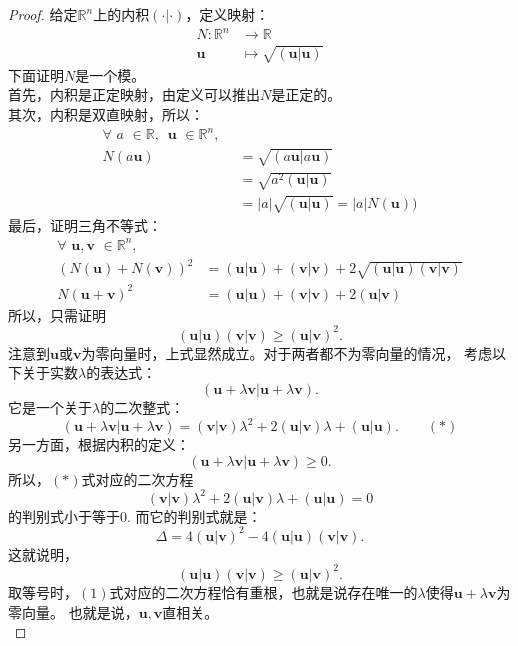 \documentclass[12pt,UTF8,fontset=none]{ctexbook}
\begin{document}
\begin{proof} %
    给定$\mathbb{R}^n$上的内积$(\cdot | \cdot)$，定义映射：
    \begin{align*}
        N : \mathbb{R}^n &\rightarrow \mathbb{R}  \\
        \mathbf{u} & \mapsto  \sqrt{(\mathbf{u} | \mathbf{u})} 
    \end{align*}
    下面证明$N$是一个模。\\
    首先，内积是正定映射，由定义可以推出$N$是正定的。\\
    其次，内积是双直映射，所以：
    \begin{align*}
        \forall \,\, a \,\, \in \mathbb{R}, \,\,\,  \mathbf{u} \,\, \in \mathbb{R}^n, \,\,\,  \\
        N(a\mathbf{u}) &= \sqrt{(a\mathbf{u} | a\mathbf{u})}  \\
        &= \sqrt{a^2(\mathbf{u} | \mathbf{u})}  \\
        &= |a| \sqrt{(\mathbf{u} | \mathbf{u})} = |a|N(\mathbf{u}))
    \end{align*}
    最后，证明三角不等式：
    \begin{align*}
        \forall \,\, \mathbf{u} ,  \mathbf{v} \,\, \in \mathbb{R}^n, \,\,\,  \\
        (N(\mathbf{u}) + N(\mathbf{v}))^2 &= (\mathbf{u} | \mathbf{u}) + (\mathbf{v} | \mathbf{v}) + 2\sqrt{(\mathbf{u} | \mathbf{u})(\mathbf{v} | \mathbf{v})}  \\
        N(\mathbf{u}+\mathbf{v})^2 &= (\mathbf{u} | \mathbf{u}) + (\mathbf{v} | \mathbf{v}) + 2(\mathbf{u} | \mathbf{v}) 
    \end{align*}
    所以，只需证明
    $$ (\mathbf{u} | \mathbf{u})(\mathbf{v} | \mathbf{v}) \geqslant (\mathbf{u} | \mathbf{v})^2. $$
    注意到$\mathbf{u}$或$\mathbf{v}$为零向量时，上式显然成立。对于两者都不为零向量的情况，
    考虑以下关于实数$\lambda$的表达式：
    $$ (\mathbf{u}+ \lambda\mathbf{v} |\mathbf{u}+ \lambda\mathbf{v} ). $$
    它是一个关于$\lambda$的二次整式：
    $$ (\mathbf{u}+ \lambda\mathbf{v} |\mathbf{u}+ \lambda\mathbf{v} ) = (\mathbf{v} | \mathbf{v}) \lambda^2 + 2 (\mathbf{u} | \mathbf{v}) \lambda + (\mathbf{u} | \mathbf{u}). \quad\quad (*)$$
    另一方面，根据内积的定义：
    $$ (\mathbf{u}+ \lambda\mathbf{v} |\mathbf{u}+ \lambda\mathbf{v} ) \geqslant 0.$$
    所以，$(*)$式对应的二次方程
    $$  (\mathbf{v} | \mathbf{v}) \lambda^2 + 2 (\mathbf{u} | \mathbf{v}) \lambda + (\mathbf{u} | \mathbf{u}) = 0  $$
    的判别式小于等于0. 而它的判别式就是：
    $$ \Delta = 4 (\mathbf{u} | \mathbf{v})^2 - 4 (\mathbf{u} | \mathbf{u}) (\mathbf{v} | \mathbf{v}). $$
    这就说明，
    $$ (\mathbf{u} | \mathbf{u})(\mathbf{v} | \mathbf{v}) \geqslant (\mathbf{u} | \mathbf{v})^2. $$
    取等号时，$(1)$式对应的二次方程恰有重根，也就是说存在唯一的$\lambda$使得$\mathbf{u}+ \lambda\mathbf{v}$为零向量。
    也就是说，$\mathbf{u}, \mathbf{v}$直相关。\\     
\end{proof}
\end{document}
